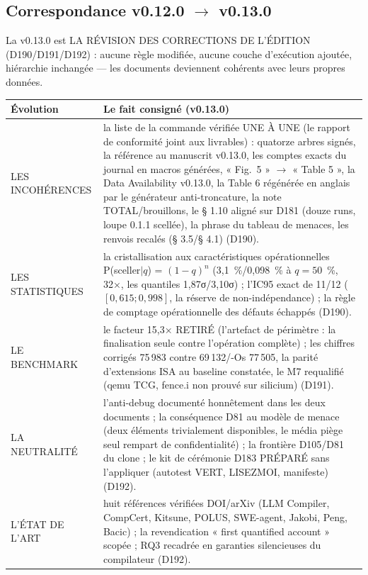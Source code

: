\subsection{Correspondance v0.12.0 $\to$ v0.13.0}\label{sec:evolutions130}

La v0.13.0 est LA RÉVISION DES CORRECTIONS DE L'ÉDITION (D190/D191/D192) :
aucune règle modifiée, aucune couche d'exécution ajoutée, hiérarchie
inchangée — les documents deviennent cohérents avec leurs propres données.

\begin{table}[tbp]
\centering
\small
\begin{tabularx}{\textwidth}{>{\raggedright\arraybackslash}p{3.4cm} X}
\textbf{Évolution} & \textbf{Le fait consigné (v0.13.0)} \\
\midrule
LES INCOHÉRENCES & la liste de la commande vérifiée UNE À UNE (le rapport
de conformité joint aux livrables) : quatorze arbres signés, la référence au
manuscrit v0.13.0, les comptes exacts du journal en macros générées,
« Fig.~5 » $\to$ « Table 5 », la Data Availability v0.13.0, la Table 6
régénérée en anglais par le générateur anti-troncature, la note
TOTAL/brouillons, le § 1.10 aligné sur D181 (douze runs, loupe 0.1.1
scellée), la phrase du tableau de menaces, les renvois recalés (§ 3.5/§ 4.1)
(D190). \\
LES STATISTIQUES & la cristallisation aux caractéristiques opérationnelles
P(sceller$|q$) = $(1-q)^n$ (3,1~\%/0,098~\% à $q = 50$~\%, 32×, les
quantiles 1,87σ/3,10σ) ; l'IC95 exact de 11/12 ($[0,615 ; 0,998]$, la
réserve de non-indépendance) ; la règle de comptage opérationnelle des
défauts échappés (D190). \\
LE BENCHMARK & le facteur 15,3× RETIRÉ (l'artefact de périmètre : la
finalisation seule contre l'opération complète) ; les chiffres corrigés
75\,983 contre 69\,132/-Os 77\,505, la parité d'extensions ISA au baseline
constatée, le M7 requalifié (qemu TCG, fence.i non prouvé sur silicium)
(D191). \\
LA NEUTRALITÉ & l'anti-debug documenté honnêtement dans les deux documents ;
la conséquence D81 au modèle de menace (deux éléments trivialement
disponibles, le média piège seul rempart de confidentialité) ; la frontière
D105/D81 du clone ; le kit de cérémonie D183 PRÉPARÉ sans l'appliquer
(autotest VERT, LISEZMOI, manifeste) (D192). \\
L'ÉTAT DE L'ART & huit références vérifiées DOI/arXiv (LLM Compiler,
CompCert, Kitsune, POLUS, SWE-agent, Jakobi, Peng, Bacic) ; la revendication
« first quantified account » scopée ; RQ3 recadrée en garanties
silencieuses du compilateur (D192). \\
\end{tabularx}
\end{table}

